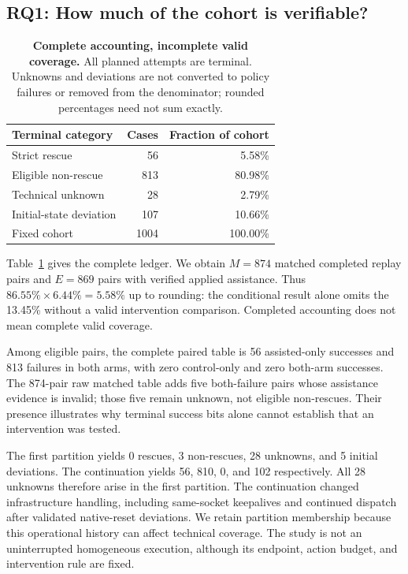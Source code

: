 \documentclass[10pt,twocolumn,letterpaper]{article}
\begin{document}
\subsection{RQ1: How much of the cohort is verifiable?}
\begin{table}[t]
\centering\small
\begin{tabular}{@{}lrr@{}}
\toprule
Terminal category & Cases & Fraction of cohort\\
\midrule
Strict rescue &56&5.58\%\\
Eligible non-rescue &813&80.98\%\\
Technical unknown &28&2.79\%\\
Initial-state deviation &107&10.66\%\\
\midrule
Fixed cohort &1004&100.00\%\\
\bottomrule
\end{tabular}
\caption{\textbf{Complete accounting, incomplete valid coverage.} All planned attempts are terminal. Unknowns and deviations are not converted to policy failures or removed from the denominator; rounded percentages need not sum exactly.}
\label{tab:coverage}
\end{table}
Table~\ref{tab:coverage} gives the complete ledger. We obtain $M=874$ matched completed replay pairs and $E=869$ pairs with verified applied assistance. Thus $86.55\%\times6.44\%=5.58\%$ up to rounding: the conditional result alone omits the 13.45\% without a valid intervention comparison. Completed accounting does not mean complete valid coverage.

Among eligible pairs, the complete paired table is 56 assisted-only successes and 813 failures in both arms, with zero control-only and zero both-arm successes. The 874-pair raw matched table adds five both-failure pairs whose assistance evidence is invalid; those five remain unknown, not eligible non-rescues. Their presence illustrates why terminal success bits alone cannot establish that an intervention was tested.

The first partition yields 0 rescues, 3 non-rescues, 28 unknowns, and 5 initial deviations. The continuation yields 56, 810, 0, and 102 respectively. All 28 unknowns therefore arise in the first partition. The continuation changed infrastructure handling, including same-socket keepalives and continued dispatch after validated native-reset deviations. We retain partition membership because this operational history can affect technical coverage. The study is not an uninterrupted homogeneous execution, although its endpoint, action budget, and intervention rule are fixed.
\end{document}
